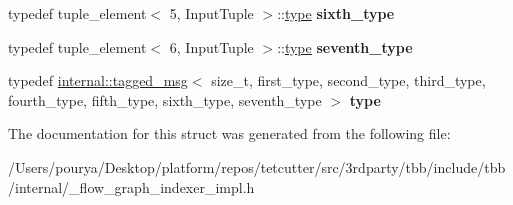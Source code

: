 \begin{DoxyCompactItemize}
\item 
\hypertarget{structinternal_1_1input__types_3_017_00_01InputTuple_01_4_a38d44aba20a349f669211be4e6b26f14}{}typedef tuple\+\_\+element$<$ 5, Input\+Tuple $>$\+::\hyperlink{classinternal_1_1tagged__msg}{type} {\bfseries sixth\+\_\+type}\label{structinternal_1_1input__types_3_017_00_01InputTuple_01_4_a38d44aba20a349f669211be4e6b26f14}

\item 
\hypertarget{structinternal_1_1input__types_3_017_00_01InputTuple_01_4_a5c04b0ec9679d8746f0eefddf4733706}{}typedef tuple\+\_\+element$<$ 6, Input\+Tuple $>$\+::\hyperlink{classinternal_1_1tagged__msg}{type} {\bfseries seventh\+\_\+type}\label{structinternal_1_1input__types_3_017_00_01InputTuple_01_4_a5c04b0ec9679d8746f0eefddf4733706}

\item 
\hypertarget{structinternal_1_1input__types_3_017_00_01InputTuple_01_4_a14cf9806e94d55f9a58d1b85bb8e1236}{}typedef \hyperlink{classinternal_1_1tagged__msg}{internal\+::tagged\+\_\+msg}$<$ size\+\_\+t, first\+\_\+type, second\+\_\+type, third\+\_\+type, fourth\+\_\+type, fifth\+\_\+type, sixth\+\_\+type, seventh\+\_\+type $>$ {\bfseries type}\label{structinternal_1_1input__types_3_017_00_01InputTuple_01_4_a14cf9806e94d55f9a58d1b85bb8e1236}

\end{DoxyCompactItemize}


The documentation for this struct was generated from the following file\+:\begin{DoxyCompactItemize}
\item 
/\+Users/pourya/\+Desktop/platform/repos/tetcutter/src/3rdparty/tbb/include/tbb/internal/\+\_\+flow\+\_\+graph\+\_\+indexer\+\_\+impl.\+h\end{DoxyCompactItemize}
